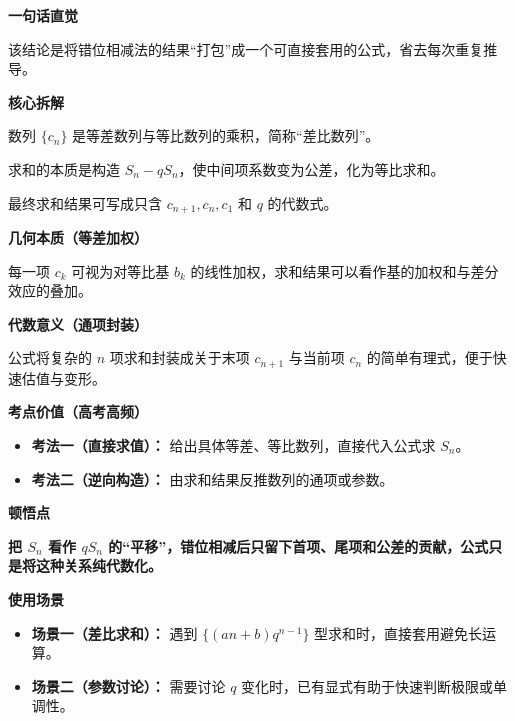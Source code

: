 \begin{explanationbox}

\textbf{\textcolor{CExplanation}{一句话直觉}}

该结论是将错位相减法的结果“打包”成一个可直接套用的公式，省去每次重复推导。

\medskip
\textbf{\textcolor{CExplanation}{核心拆解}}
\begin{description}[style=nextline, leftmargin=2.8em, labelsep=0.5em, itemsep=0.45em]
    \item[\textbf{要点一（差比结构）：}] 数列 \(\{c_n\}\) 是等差数列与等比数列的乘积，简称“差比数列”。
    \item[\textbf{要点二（错位消元）：}] 求和的本质是构造 \(S_n - q S_n\)，使中间项系数变为公差，化为等比求和。
    \item[\textbf{要点三（封闭形式）：}] 最终求和结果可写成只含 \(c_{n+1}, c_n, c_1\) 和 \(q\) 的代数式。
\end{description}

\medskip
\textbf{\textcolor{CExplanation}{几何本质（等差加权）}}

每一项 \(c_k\) 可视为对等比基 \(b_k\) 的线性加权，求和结果可以看作基的加权和与差分效应的叠加。

\medskip
\textbf{\textcolor{CExplanation}{代数意义（通项封装）}}

公式将复杂的 \(n\) 项求和封装成关于末项 \(c_{n+1}\) 与当前项 \(c_n\) 的简单有理式，便于快速估值与变形。

\medskip
\textbf{\textcolor{CExplanation}{考点价值（高考高频）}}
\begin{itemize}[leftmargin=*, itemsep=0.5em, topsep=0.4em]
    \item \textbf{考法一（直接求值）：} 给出具体等差、等比数列，直接代入公式求 \(S_n\)。
    \item \textbf{考法二（逆向构造）：} 由求和结果反推数列的通项或参数。
\end{itemize}

\medskip
\textbf{\textcolor{CExplanation}{顿悟点}}

\textbf{把 \(S_n\) 看作 \(q S_n\) 的“平移”，错位相减后只留下首项、尾项和公差的贡献，公式只是将这种关系纯代数化。}

\medskip
\textbf{\textcolor{CExplanation}{使用场景}}
\begin{itemize}[leftmargin=*, itemsep=0.5em, topsep=0.4em]
    \item \textbf{场景一（差比求和）：} 遇到 \(\{ (an+b) q^{n-1} \}\) 型求和时，直接套用避免长运算。
    \item \textbf{场景二（参数讨论）：} 需要讨论 \(q\) 变化时，已有显式有助于快速判断极限或单调性。
\end{itemize}
\end{explanationbox}

